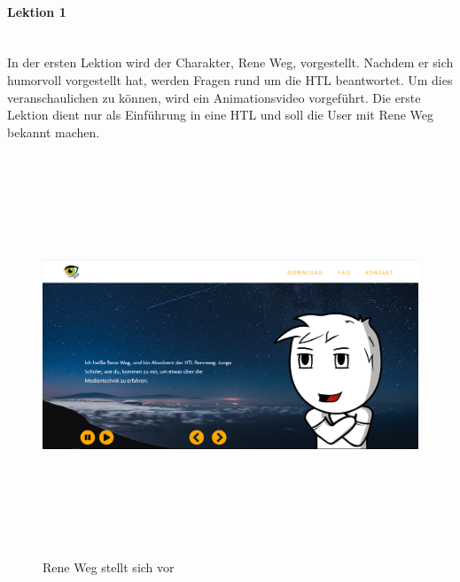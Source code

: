 \paragraph{Lektion 1}\leavevmode \\
In der ersten Lektion wird der Charakter, Rene Weg, vorgestellt. Nachdem er sich humorvoll vorgestellt hat, werden Fragen rund um die HTL beantwortet. Um dies veranschaulichen zu können, wird ein Animationsvideo vorgeführt. Die erste Lektion dient nur als Einführung in eine HTL und soll die User mit Rene Weg bekannt machen. 
\begin{figure} [H]
	\centering
\includegraphics[width=12cm,height=12cm,keepaspectratio]{webseite_abb12} 
	\caption{Rene Weg stellt sich vor}
\end{figure}
